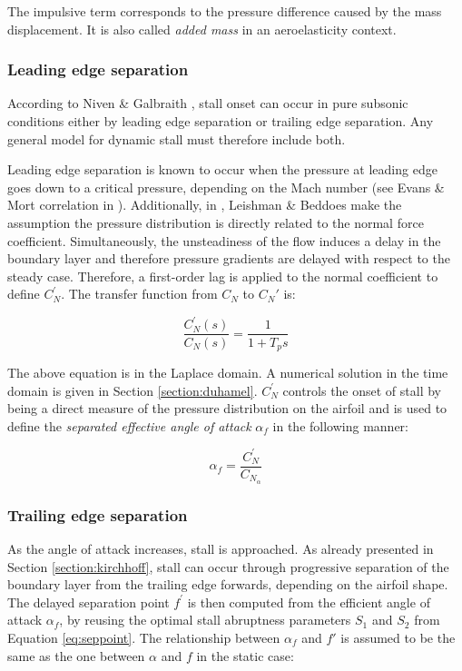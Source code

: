  The impulsive term corresponds to the pressure difference caused by the mass displacement. It is also called \textit{added mass} in an aeroelasticity context.

\subsubsection{Leading edge separation}

According to Niven \& Galbraith \cite{niven_modelling_1997}, stall onset can occur in pure subsonic conditions either by leading edge separation or trailing edge separation. Any general model for dynamic stall must therefore include both. 

Leading edge separation is known to occur when the pressure at leading edge goes down to a critical pressure, depending on the Mach number (see Evans \& Mort correlation in \cite{sheng_new_2006}). Additionally, in \cite{leishman_semi-empirical_1989}, Leishman \& Beddoes make the assumption the pressure distribution is directly related to the normal force coefficient. Simultaneously, the unsteadiness of the flow induces a delay in the boundary layer and therefore pressure gradients are delayed with respect to the steady case. Therefore, a first-order lag is applied to the normal coefficient to define $C_N^{\prime}$. The transfer function from $C_N$ to $C_N'$ is: 

\begin{equation}
\frac{C_N^{\prime}(s)}{C_N(s)} = \frac{1}{1+T_p s}
\label{eq:cnprime_laplace}  
\end{equation}

The above equation is in the Laplace domain. A numerical solution in the time domain is given in Section \ref{section:duhamel}. $C_N^{\prime}$ controls the onset of stall by being a direct measure of the pressure distribution on the airfoil and is used to define the \textit{separated effective angle of attack} $\alpha_f$ in the following manner:

\begin{equation}
\alpha_f = \frac{C_N^{\prime}}{C_{N_\alpha}}
\label{eq:separated_effective_alpha}
\end{equation}

\subsubsection{Trailing edge separation}

As the angle of attack increases, stall is approached. As already presented in Section \ref{section:kirchhoff}, stall can occur through progressive separation of the boundary layer from the trailing edge forwards, depending on the airfoil shape. The delayed separation point $f^{\prime}$ is then computed from the efficient angle of attack $\alpha_f$, by reusing the optimal stall abruptness parameters $S_1$ and $S_2$ from Equation \eqref{eq:seppoint}.  The relationship between $\alpha_f$ and $f'$ is assumed to be the same as the one between $\alpha$ and $f$ in the static case:

